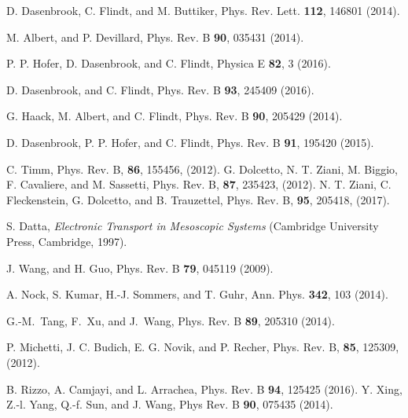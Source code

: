 \documentclass[aps,prb,twocolumn,footinbib,showpacs,superscriptaddress,preprintnumbers,amsmath,amssymb]{revtex4-1}
\begin{document}
\begin{thebibliography}{99}
D. Dasenbrook, C. Flindt, and M. Buttiker, Phys. Rev. Lett. {\bf 112}, 146801 (2014).

M. Albert, and P. Devillard, Phys. Rev. B {\bf 90}, 035431 (2014).

P. P. Hofer, D. Dasenbrook, and C. Flindt, Physica E {\bf 82}, 3 (2016).


%

D. Dasenbrook, and C. Flindt, Phys. Rev. B {\bf 93}, 245409 (2016).


G. Haack, M. Albert, and C. Flindt, Phys. Rev. B {\bf 90}, 205429 (2014).

D. Dasenbrook, P. P. Hofer, and C. Flindt, Phys. Rev. B {\bf 91}, 195420 (2015).

 C. Timm, Phys. Rev. B, {\bf 86}, 155456, (2012).
 G. Dolcetto, N. T. Ziani, M. Biggio, F. Cavaliere, and M. Sassetti, Phys. Rev. B, {\bf 87}, 235423, (2012).
 N. T. Ziani, C. Fleckenstein, G. Dolcetto, and B. Trauzettel, Phys. Rev. B, {\bf 95}, 205418, (2017).

 S. Datta, {\it Electronic Transport in Mesoscopic Systems} (Cambridge University Press, Cambridge, 1997).

 J. Wang, and H. Guo, Phys. Rev. B {\bf 79}, 045119 (2009).

 A. Nock, S. Kumar, H.-J. Sommers, and T. Guhr, Ann. Phys. {\bf 342}, 103 (2014). %

 G.-M.~Tang, F.~Xu, and J.~Wang, Phys. Rev. B {\bf 89}, 205310 (2014).


 P. Michetti, J. C. Budich, E. G. Novik, and P. Recher, Phys. Rev. B, {\bf 85}, 125309, (2012).

  B. Rizzo, A. Camjayi, and L. Arrachea, Phys. Rev. B {\bf 94}, 125425 (2016).
 Y. Xing, Z.-l. Yang, Q.-f. Sun, and J. Wang, Phys Rev. B {\bf 90}, 075435 (2014).

\end{thebibliography}
\end{document}
